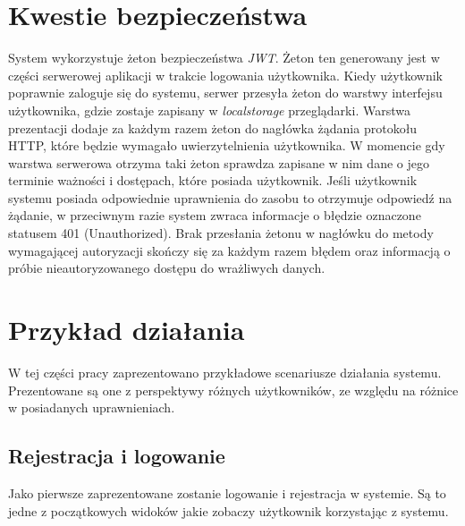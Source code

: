 \documentclass[a4paper,twoside,12pt]{book}
\begin{document}
\section {Kwestie bezpieczeństwa}

System wykorzystuje żeton bezpieczeństwa \textit{JWT}. Żeton ten generowany jest w części serwerowej aplikacji w trakcie logowania użytkownika. Kiedy użytkownik poprawnie zaloguje się do systemu, serwer przesyła żeton do warstwy interfejsu użytkownika, gdzie zostaje zapisany w \textit{localstorage} przeglądarki. Warstwa prezentacji dodaje za każdym razem żeton do nagłówka żądania protokołu HTTP, które będzie wymagało uwierzytelnienia użytkownika. W momencie gdy warstwa serwerowa otrzyma taki żeton sprawdza zapisane w nim dane o jego terminie ważności i dostępach, które posiada użytkownik. Jeśli użytkownik systemu posiada odpowiednie uprawnienia do zasobu to otrzymuje odpowiedź na żądanie, w przeciwnym razie system zwraca informacje o błędzie oznaczone statusem 401 (Unauthorized). Brak przesłania żetonu w nagłówku do metody wymagającej autoryzacji skończy się za każdym razem błędem oraz informacją o próbie nieautoryzowanego dostępu do wrażliwych danych.

\section {Przykład działania}
\label{UseExample}
W tej części pracy zaprezentowano przykładowe scenariusze działania systemu. Prezentowane są one z perspektywy różnych użytkowników, ze względu na różnice w posiadanych uprawnieniach.

\subsection{Rejestracja i logowanie}
Jako pierwsze zaprezentowane zostanie logowanie i rejestracja w systemie. Są to jedne z początkowych widoków jakie zobaczy użytkownik korzystając z systemu.
\end{document}
